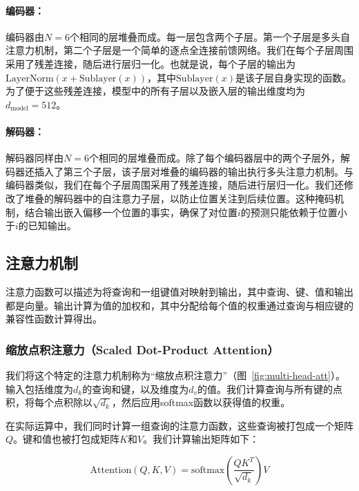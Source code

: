 \documentclass[lang=cn,a4paper,newtx]{elegantpaper}
\newcommand{\dmodel}{d_{\text{model}}}
\begin{document}
\paragraph{编码器：}编码器由$N=6$个相同的层堆叠而成。每一层包含两个子层。第一个子层是多头自注意力机制，第二个子层是一个简单的逐点全连接前馈网络。我们在每个子层周围采用了残差连接，随后进行层归一化。也就是说，每个子层的输出为$\mathrm{LayerNorm}(x + \mathrm{Sublayer}(x))$，其中$\mathrm{Sublayer}(x)$是该子层自身实现的函数。为了便于这些残差连接，模型中的所有子层以及嵌入层的输出维度均为$\dmodel=512$。

\paragraph{解码器：}解码器同样由$N=6$个相同的层堆叠而成。除了每个编码器层中的两个子层外，解码器还插入了第三个子层，该子层对堆叠的编码器的输出执行多头注意力机制。与编码器类似，我们在每个子层周围采用了残差连接，随后进行层归一化。我们还修改了堆叠的解码器中的自注意力子层，以防止位置关注到后续位置。这种掩码机制，结合输出嵌入偏移一个位置的事实，确保了对位置$i$的预测只能依赖于位置小于$i$的已知输出。

\subsection{注意力机制} \label{sec:attention}

注意力函数可以描述为将查询和一组键值对映射到输出，其中查询、键、值和输出都是向量。输出计算为值的加权和，其中分配给每个值的权重通过查询与相应键的兼容性函数计算得出。

\subsubsection{缩放点积注意力（Scaled Dot-Product Attention）} \label{sec:scaled-dot-prod}

我们将这个特定的注意力机制称为“缩放点积注意力”（图~\ref{fig:multi-head-att}）。输入包括维度为$d_k$的查询和键，以及维度为$d_v$的值。我们计算查询与所有键的点积，将每个点积除以$\sqrt{d_k}$，然后应用softmax函数以获得值的权重。

在实际运算中，我们同时计算一组查询的注意力函数，这些查询被打包成一个矩阵$Q$。键和值也被打包成矩阵$K$和$V$。我们计算输出矩阵如下：

\begin{equation}
  \mathrm{Attention}(Q, K, V) = \mathrm{softmax}(\frac{QK^T}{\sqrt{d_k}})V
\end{equation}
\end{document}
